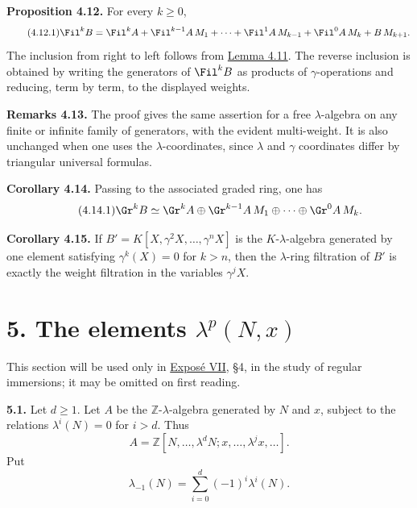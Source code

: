 \textbf{Proposition 4.12.} For every \(k\ge0\),
\begin{equation}\tag{4.12.1}
  \Fil^kB=
  \Fil^kA+\Fil^{k-1}A\,M_1+\cdots+\Fil^1A\,M_{k-1}
  +\Fil^0A\,M_k+B\,M_{k+1}.
\end{equation}
The inclusion from right to left follows from \hyperlink{sga6.e05.lem.4-11}{Lemma 4.11}. The reverse inclusion is obtained by writing the generators of \(\Fil^kB\) as products of \(\gamma\)-operations and reducing, term by term, to the displayed weights.

\textbf{Remarks 4.13.} The proof gives the same assertion for a free \(\lambda\)-algebra on any finite or infinite family of generators, with the evident multi-weight. It is also unchanged when one uses the \(\lambda\)-coordinates, since \(\lambda\) and \(\gamma\) coordinates differ by triangular universal formulas.

\textbf{Corollary 4.14.} Passing to the associated graded ring, one has
\begin{equation}\tag{4.14.1}
  \Gr^kB\simeq
  \Gr^kA\oplus \Gr^{k-1}A\,M_1\oplus\cdots\oplus\Gr^0A\,M_k.
\end{equation}

\textbf{Corollary 4.15.} If \(B'=K[X,\gamma^2X,\ldots,\gamma^nX]\) is the \(K\)-\(\lambda\)-algebra generated by one element satisfying \(\gamma^k(X)=0\) for \(k>n\), then the \(\lambda\)-ring filtration of \(B'\) is exactly the weight filtration in the variables \(\gamma^jX\).

\section*{5. The elements \(\lambda^p(N,x)\)}

This section will be used only in \hyperlink{sga6.e07.expose}{Exposé VII}, §4, in the study of regular immersions; it may be omitted on first reading.

\textbf{5.1.} Let \(d\ge1\). Let \(A\) be the \(\mathbb Z\)-\(\lambda\)-algebra generated by \(N\) and \(x\), subject to the relations \(\lambda^i(N)=0\) for \(i>d\). Thus
\[
  A=\mathbb Z[N,\ldots,\lambda^dN;
       x,\ldots,\lambda^jx,\ldots].
\]
Put
\begin{equation}\tag{5.1.1}
  \lambda_{-1}(N)=\sum_{i=0}^{d}(-1)^i\lambda^i(N).
\end{equation}

